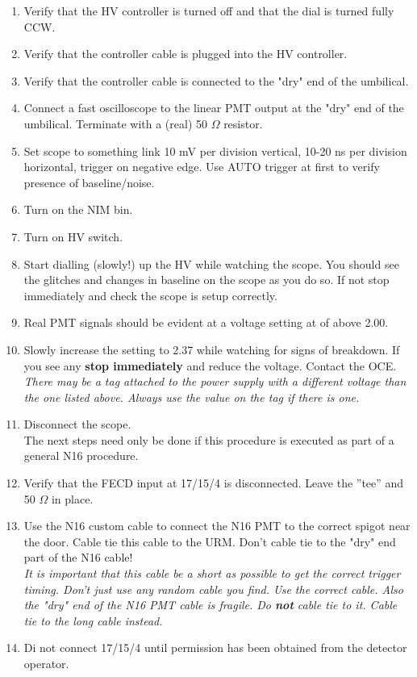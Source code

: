 \documentclass[10pt]{article}
\begin{document}
\begin{enumerate}
\item \CheckBox[name=n16pmt1]{} Verify that the HV controller is turned off and that the dial is turned fully CCW.
\item \CheckBox[name=n16pmt2]{} Verify that the controller cable is plugged into the HV controller.
\item \CheckBox[name=n16pmt3]{} Verify that the controller cable is connected to the "dry" end of the umbilical.
\item \CheckBox[name=n16pmt4]{} Connect a fast oscilloscope to the linear PMT output at the "dry" end of the umbilical. Terminate with a (real) 50 $\Omega$ resistor.
\item \CheckBox[name=n16pmt5]{} Set scope to something link 10 mV per division vertical, 10-20 ns per division horizontal, trigger on negative edge. Use AUTO trigger at first to verify presence of baseline/noise.
\item \CheckBox[name=n16pmt6]{} Turn on the NIM bin.
\item \CheckBox[name=n16pmt7]{} Turn on HV switch.
\item \CheckBox[name=n16pmt8]{} Start dialling (slowly!) up the HV while watching the scope. You should see the glitches and changes in baseline on the scope as you do so. If not stop immediately and check the scope is setup correctly.
\item \CheckBox[name=n16pmt9]{} Real PMT signals should be evident at a voltage setting at of above 2.00.
\item \CheckBox[name=n16pmt10]{} Slowly increase the setting to 2.37 while watching for signs of breakdown. If you see any {\bf stop immediately} and reduce the voltage. Contact the OCE. {\it There may be a tag attached to the power supply with a different voltage than the one listed above. Always use the value on the tag if there is one.}
\item \CheckBox[name=n16pmt11]{} Disconnect the scope.\\ The next steps need only be done if this procedure is executed as part of a general N16 procedure.
\item \CheckBox[name=n16pmt12]{} Verify that the FECD input at 17/15/4 is disconnected. Leave the ''tee'' and 50 $\Omega$ in place.
\item \CheckBox[name=n16pmt13]{} Use the N16 custom cable to connect the N16 PMT to the correct spigot near the door. Cable tie this cable to the URM. Don't cable tie to the "dry" end part of the N16 cable! \\ {\it It is important that this cable be a short as possible to get the correct trigger timing. Don't just use any random cable you find. Use the correct cable. Also the "dry" end of the N16 PMT cable is fragile. Do {\bf not} cable tie to it. Cable tie to the long cable instead.}
\item \CheckBox[name=n16pmt14]{} Di not connect 17/15/4 until permission has been obtained from the detector operator.
\end{enumerate}
\end{document}
